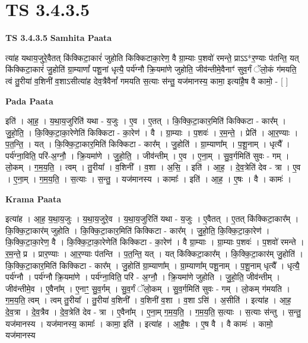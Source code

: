\documentclass[17pt]{extarticle}
\begin{document}
\section{ TS 3.4.3.5 }

\textbf{TS 3.4.3.5 } \newline
\textbf{Samhita Paata} \newline

त्या॑ह यथाय॒जुरे॒वैतत् कि॑क्किटा॒कारं॑ जुहोति किक्किटाका॒रेण॒ वै ग्रा॒म्याः प॒शवो॑ रमन्ते॒ प्राऽऽ*र॒ण्याः प॑तन्ति॒ यत् कि॑क्किटा॒कारं॑ जु॒होति॑ ग्रा॒म्याणां᳚ पशू॒नां धृत्यै॒ पर्य॑ग्नौ क्रि॒यमा॑णे जुहोति॒ जीव॑न्तीमे॒वैनाꣳ॑ सुव॒र्गं ॅलो॒कं ग॑मयति॒ त्वं तु॒रीया॑ व॒शिनी॑ व॒शाऽसीत्या॑ह देव॒त्रैवैनां᳚ गमयति स॒त्याः स॑न्तु॒ यज॑मानस्य॒ कामा॒ इत्या॑है॒ष वै कामो॒ -  [  ] \newline

\textbf{Pada Paata} \newline

इति॑ । आ॒ह॒ । य॒था॒य॒जुरिति॑ यथा - य॒जुः । ए॒व । ए॒तत् । कि॒क्कि॒टा॒कार॒मिति॑ किक्किटा - कार᳚म् । जु॒हो॒ति॒ । कि॒क्कि॒टा॒का॒रेणेति॑ किक्किटा - का॒रेण॑ । वै । ग्रा॒म्याः । प॒शवः॑ । र॒म॒न्ते॒ । प्रेति॑ । आ॒र॒ण्याः । प॒त॒न्ति॒ । यत् । कि॒क्कि॒टा॒कार॒मिति॑ किक्किटा - कार᳚म् । जु॒होति॑ । ग्रा॒म्याणा᳚म् । प॒शू॒नाम् । धृत्यै᳚ । पर्य॑ग्ना॒विति॒ परि॑-अ॒ग्नौ॒ । क्रि॒यमा॑णे । जु॒हो॒ति॒ । जीव॑न्तीम् । ए॒व । ए॒ना॒म् । सु॒व॒र्गमिति॑ सुवः - गम् । लो॒कम् । ग॒म॒य॒ति॒ । त्वम् । तु॒रीया᳚ । व॒शिनी᳚ । व॒शा । अ॒सि॒ । इति॑ । आ॒ह॒ । दे॒व॒त्रेति॑ देव - त्रा । ए॒व । ए॒ना॒म् । ग॒म॒य॒ति॒ । स॒त्याः । स॒न्तु॒ । यज॑मानस्य । कामाः᳚ । इति॑ । आ॒ह॒ । ए॒षः । वै । कामः॑ ।  \newline


\textbf{Krama Paata} \newline

इत्या॑ह । आ॒ह॒ य॒था॒य॒जुः । य॒था॒य॒जुरे॒व । य॒था॒य॒जुरिति॑ यथा - य॒जुः । ए॒वैतत् । ए॒तत् कि॑क्किटा॒कार᳚म् । कि॒क्कि॒टा॒कार॑म् जुहोति । कि॒क्कि॒टा॒कार॒मिति॑ किक्किटा - कार᳚म् । जु॒हो॒ति॒ कि॒क्कि॒टा॒का॒रेण॑ । कि॒क्कि॒टा॒का॒रेण॒ वै । कि॒क्कि॒टा॒का॒रेणेति॑ किक्किटा - का॒रेण॑ । वै ग्रा॒म्याः । ग्रा॒म्याः प॒शवः॑ । प॒शवो॑ रमन्ते । र॒म॒न्ते॒ प्र । प्रार॒ण्याः । आ॒र॒ण्याः प॑तन्ति । प॒त॒न्ति॒ यत् । यत् कि॑क्किटा॒कार᳚म् । कि॒क्कि॒टा॒कार॑म् जु॒होति॑ । कि॒क्कि॒टा॒कार॒मिति॑ किक्किटा - कार᳚म् । जु॒होति॑ ग्रा॒म्याणा᳚म् । ग्रा॒म्याणा᳚म् पशू॒नाम् । प॒शू॒नाम् धृत्यै᳚ । धृत्यै॒ पर्य॑ग्नौ । पर्य॑ग्नौ क्रि॒यमा॑णे । पर्य॑ग्ना॒विति॒ परि॑ - अ॒ग्नौ॒ । क्रि॒यमा॑णे जुहोति । जु॒हो॒ति॒ जीव॑न्तीम् । जीव॑न्तीमे॒व । ए॒वैना᳚म् । ए॒नाꣳ॒॒ सु॒व॒र्गम् । सु॒व॒र्गं ॅलो॒कम् । सु॒व॒र्गमिति॑ सुवः - गम् । लो॒कम् ग॑मयति । ग॒म॒य॒ति॒ त्वम् । त्वम् तु॒रीया᳚ । तु॒रीया॑ व॒शिनी᳚ । व॒शिनी॑ व॒शा । व॒शा ऽसि॑ । अ॒सीति॑ । इत्या॑ह । आ॒ह॒ दे॒व॒त्रा । दे॒व॒त्रैव । दे॒व॒त्रेति॑ देव - त्रा । ए॒वैना᳚म् । ए॒ना॒म् ग॒म॒य॒ति॒ । ग॒म॒य॒ति॒ स॒त्याः । स॒त्याः स॑न्तु । स॒न्तु॒ यज॑मानस्य । यज॑मानस्य॒ कामाः᳚ । कामा॒ इति॑ । इत्या॑ह । आ॒है॒षः । ए॒ष वै । वै कामः॑ । कामो॒ यज॑मानस्य \newline
\end{document}
